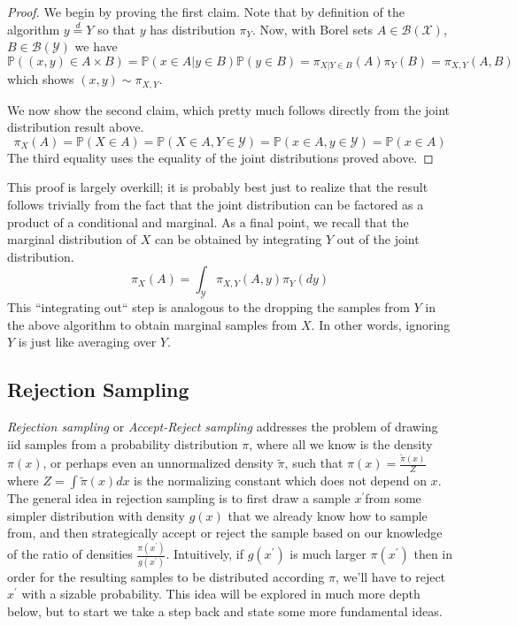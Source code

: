 \documentclass[12pt]{article}
\newcommand{\Prob}{\mathbb{P}}
\begin{document}
\begin{proof}
We begin by proving the first claim. Note that by definition of the algorithm $y \overset{d}{=} Y$ so that $y$ has distribution $\pi_Y$. Now, with Borel sets 
$A \in \mathcal{B}(\mathcal{X})$, $B \in \mathcal{B}(\mathcal{Y})$ we have 
\[\Prob((x, y) \in A \times B) = \Prob(x \in A | y \in B)\Prob(y \in B) = \pi_{X|Y\in B}(A)\pi_Y(B) = \pi_{X, Y}(A, B)\]
which shows $(x, y) \sim \pi_{X, Y}$. 

We now show the second claim, which pretty much follows directly from the joint distribution result above. 
\[\pi_X(A) = \Prob(X \in A) = \Prob(X \in A, Y \in \mathcal{Y}) = \Prob(x \in A, y \in \mathcal{Y}) = \Prob(x \in A)\]
The third equality uses the equality of the joint distributions proved above. 
\end{proof}
This proof is largely overkill; it is probably best just to realize that the result follows trivially from the fact that the joint distribution can be factored as a product
of a conditional and marginal. As a final point, we recall that the marginal distribution of $X$ can be obtained by integrating $Y$ out of the joint distribution. 
\[\pi_X(A) = \int_\mathcal{Y} \pi_{X, Y}(A, y) \pi_Y(dy)\]
This ``integrating out`` step is analogous to the dropping the samples from $Y$ in the above algorithm to obtain marginal samples from $X$. In other words, 
ignoring $Y$ is just like averaging over $Y$. 

\subsection{Rejection Sampling}
\textit{Rejection sampling} or \textit{Accept-Reject sampling} addresses the problem of drawing iid samples from a probability distribution $\pi$, where all we know is the 
density $\pi(x)$, or perhaps even an unnormalized density $\tilde{\pi}$, such that $\pi(x) = \frac{\tilde{\pi}(x)}{Z}$ where $Z = \int \tilde{\pi}(x) dx$ is the normalizing constant which 
does not depend on $x$. The general idea in rejection sampling is to first draw a sample $x^\prime $from some simpler distribution with density $g(x)$ that we already know how to sample from,
 and then strategically accept or reject the sample based on our knowledge of the ratio of densities $\frac{\pi(x^\prime)}{g(x^\prime)}$. Intuitively, if $g(x^\prime)$ is much larger $\pi(x^\prime)$ then 
 in order for the resulting samples to be distributed according $\pi$, we'll have to reject $x^\prime$ with a sizable probability. This idea will be explored in much more depth below, but to start we take 
 a step back and state some more fundamental ideas. 
 
\end{document}
